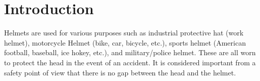 \documentclass[sigchi,authordraft]{acmart}
\begin{document}



\maketitle

\section{Introduction}
\label{sec:introduction}
Helmets are used for various purposes such as industrial protective hat (work helmet), motorcycle Helmet (bike, car, bicycle, etc.), sports helmet (American football, baseball, ice hokey, etc.), and military/police helmet. These are all worn to protect the head in the event of an accident\cite{helmet}. It is considered important from a safety point of view that there is no gap between the head and the helmet.\par

\end{document}
